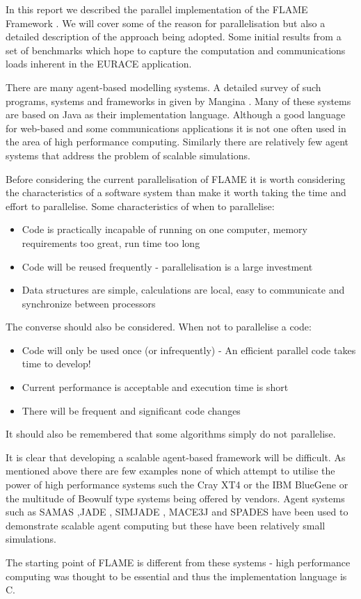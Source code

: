 In this report we described the parallel implementation of the FLAME Framework \cite{Coakley}. We will cover some of the reason for parallelisation but also a detailed description of the approach being adopted. Some initial results from a set of benchmarks which hope to capture the computation and communications loads inherent in the EURACE application.

There are many agent-based modelling systems. A detailed survey of such programs, systems and frameworks in given by Mangina \cite{Mangina}. Many of these systems are based on Java as their implementation language. Although a good language for web-based and some communications applications it is not one often used in the area of high performance computing. Similarly there are relatively few agent systems that address the problem of scalable simulations.

Before considering the current parallelisation of FLAME it is worth considering the characteristics of a software system than make it worth taking the time and effort to parallelise. Some characteristics of when to parallelise:
\begin{itemize}
\item Code is practically incapable of running on one computer, memory requirements too great, run time too long
\item Code will be reused frequently - parallelisation is a large investment
\item Data structures are simple, calculations are local, easy to communicate and synchronize between processors
\end{itemize}
The converse should also be considered. When not to parallelise a code:
\begin{itemize}
\item Code will only be used once (or infrequently) - An efficient parallel code takes time to develop!
\item Current performance is acceptable and execution time is short
\item There will be frequent and significant code changes
\end{itemize}
It should also be remembered that some algorithms simply do not parallelise.

It is clear that developing a scalable agent-based framework will be difficult. As mentioned above there are few examples none of which attempt to utilise the power of high performance systems such the Cray XT4 or the IBM BlueGene or the multitude of Beowulf type systems being offered by vendors. Agent systems such as SAMAS \cite{SAMAS},JADE \cite {JADE}, SIMJADE \cite{SIMJADE}, MACE3J \cite{MACE3J} and SPADES \cite{SPADES} have been used to demonstrate scalable agent computing but these have been relatively small simulations.

The starting point of FLAME is different from these systems - high performance computing was thought to be essential and thus the implementation language is C.